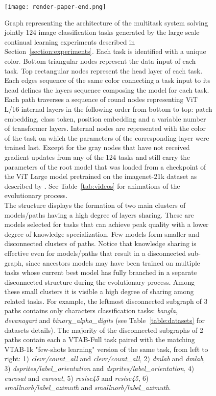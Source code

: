 \documentclass{article} \usepackage{iclr2023_conference,times}
\begin{document}
\begin{figure}[h]
\centering
\texttt{[image: render-paper-end.png]}
\caption{Graph representing the architecture of the multitask system solving jointly 124 image classification tasks generated by the large scale continual learning experiments described in Section~\ref{section:experiments}.
Each task is identified with a unique color.
Bottom triangular nodes represent the data input of each task.
Top rectangular nodes represent the head layer of each task.
Each edges sequence of the same color connecting a task input to its head defines the layers sequence composing the model for each task.
Each path traverses a sequence of round nodes representing ViT L/16 internal layers in the following order from bottom to top: patch embedding, class token, position embedding and a variable number of transformer layers.
Internal nodes are represented with the color of the task on which the parameters of the corresponding layer were trained last.
Except for the gray nodes that have not received gradient updates from any of the 124 tasks and still carry the parameters of the root model that was loaded from a checkpoint of the ViT Large model pretrained on the imagenet-21k dataset as described by \cite{Gesmundo2022munet2}. See Table~\ref{tab:videos} for animations of the evolutionary process.
\\
The structure displays the formation of two main clusters of models/paths having a high degree of layers sharing.
These are models selected for tasks that can achieve peak quality with a lower degree of knowledge specialization.
Few models form smaller and disconnected clusters of paths.
Notice that knowledge sharing is effective even for models/paths that result in a disconnected sub-graph, since ancestors models may have been trained on multiple tasks whose current best model has fully branched in a separate disconnected structure during the evolutionary process.
Among these small clusters it is visible a high degree of sharing among related tasks.
For example, the leftmost disconnected subgraph of 3 paths  contains only characters classification tasks: \emph{bangla}, \emph{devanagari} and \emph{binary\_alpha\_digits} (see Table~\ref{table:datasets} for datasets details).
The majority of the disconnected subgraphs of 2 paths contain each a VTAB-Full task paired with the matching VTAB-1k "few-shots learning" version of the same task, from left to right: 1) \emph{clevr/count\_all} and \emph{clevr/count\_all},
2) \emph{dmlab} and \emph{dmlab},
3) \emph{dsprites/label\_orientation} and \emph{dsprites/label\_orientation},
4) \emph{eurosat} and \emph{eurosat},
5) \emph{resisc45} and \emph{resisc45},
6) \emph{smallnorb/label\_azimuth} and \emph{smallnorb/label\_azimuth}.
}
\label{fig:deca-30}
\end{figure}
\end{document}

